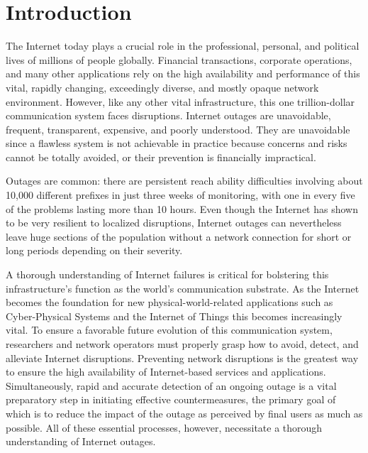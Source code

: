 \section{Introduction}

\textbf{}
The Internet today plays a crucial role in the professional, personal, and political lives of millions of people globally. Financial transactions, corporate operations, and many other applications rely on the high availability and performance of this vital, rapidly changing, exceedingly diverse, and mostly opaque network environment. However, like any other vital infrastructure, this one trillion-dollar communication system faces disruptions. Internet outages are unavoidable, frequent, transparent, expensive, and poorly understood. They are unavoidable since a flawless system is not achievable in practice because concerns and risks cannot be totally avoided, or their prevention is financially impractical\cite{aceto2018comprehensive}.

Outages are common: there are persistent reach ability difficulties involving about 10,000 different prefixes in just three weeks of monitoring, with one in every five of the problems lasting more than 10 hours.\cite{katz2008studying} Even though the Internet has shown to be very resilient to localized disruptions, Internet outages can nevertheless leave huge sections of the population without a network connection for short or long periods depending on their severity.\cite{perlin2012downtime}

A thorough understanding of Internet failures is critical for bolstering this infrastructure's function as the world's communication substrate. As the Internet becomes the foundation for new physical-world-related applications such as Cyber-Physical Systems and the Internet of Things this becomes increasingly vital. To ensure a favorable future evolution of this communication system, researchers and network operators must properly grasp how to avoid, detect, and alleviate Internet disruptions. Preventing network disruptions is the greatest way to ensure the high availability of Internet-based services and applications. Simultaneously, rapid and accurate detection of an ongoing outage is a vital preparatory step in initiating effective countermeasures, the primary goal of which is to reduce the impact of the outage as perceived by final users as much as possible. All of these essential processes, however, necessitate a thorough understanding of Internet outages.

